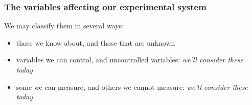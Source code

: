 \begin{comment}
\begin{frame}\frametitle{Cellphone app example: test your understanding}
	
	
	Are these ``disturbances'' (\emph{not measured, not controlled}), or \\
	\qquad\quad\,\,\,\,\,\, ``covariates'' \,\,\,\, (\emph{measured, but not controlled}), or \\
	\qquad\quad\,\,\,\,\,\, ``neither of these'':
	
	\vspace{0.5cm}
	
	\begin{itemize}
		\item	\textbf{E}: smartphone user's age
		\item	\textbf{N}: smartphone user's gender
		\item	\textbf{S}: smartphone user's connection speed (e.g. cell, or wifi)
		\item	\textbf{R}: amount of free memory (RAM) on the device
		\item	\textbf{F}: whether the advert/message is delivered via ad network G, or ad network H
		\item	\textbf{D}: if the user's phone is Android or Apple		
	\end{itemize}
	
	\vspace{0.5cm}
	
	Participate in the forums and share your opinion at \href{http://yint.org/cal-app}{http://yint.org/cal-app}
\end{frame}

\end{comment}

\begin{frame}\frametitle{The variables affecting our experimental system}
	We may classify them in several ways:
	
	\begin{itemize}
		\item	those we know about, and those that are unknown
			\pause
		\item	variables we can control, and uncontrolled variables: \emph{we'll consider these today}
			\pause
		\item	some we can measure, and others we cannot measure: \emph{we'll consider these today}
		
	\end{itemize}	
\end{frame}

